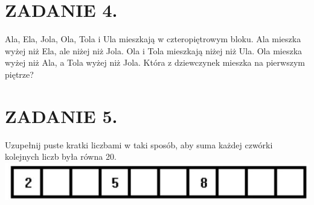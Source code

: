 \documentclass[10pt]{article}
\begin{document}
\section*{ZADANIE 4.}
Ala, Ela, Jola, Ola, Tola i Ula mieszkają w czteropiętrowym bloku. Ala mieszka wyżej niż Ela, ale niżej niż Jola. Ola i Tola mieszkają niżej niż Ula. Ola mieszka wyżej niż Ala, a Tola wyżej niż Jola. Która z dziewczynek mieszka na pierwszym piętrze?

\section*{ZADANIE 5.}
Uzupełnij puste kratki liczbami w taki sposób, aby suma każdej czwórki kolejnych liczb była równa 20.\\
\includegraphics[max width=\textwidth, center]{2024_11_21_75ffe54ddbccdee3aceag-1}
\end{document}
